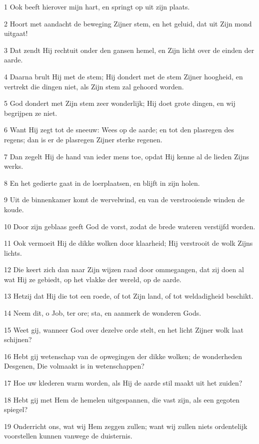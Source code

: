 \par 1 Ook beeft hierover mijn hart, en springt op uit zijn plaats.
\par 2 Hoort met aandacht de beweging Zijner stem, en het geluid, dat uit Zijn mond uitgaat!
\par 3 Dat zendt Hij rechtuit onder den gansen hemel, en Zijn licht over de einden der aarde.
\par 4 Daarna brult Hij met de stem; Hij dondert met de stem Zijner hoogheid, en vertrekt die dingen niet, als Zijn stem zal gehoord worden.
\par 5 God dondert met Zijn stem zeer wonderlijk; Hij doet grote dingen, en wij begrijpen ze niet.
\par 6 Want Hij zegt tot de sneeuw: Wees op de aarde; en tot den plasregen des regens; dan is er de plasregen Zijner sterke regenen.
\par 7 Dan zegelt Hij de hand van ieder mens toe, opdat Hij kenne al de lieden Zijns werks.
\par 8 En het gedierte gaat in de loerplaatsen, en blijft in zijn holen.
\par 9 Uit de binnenkamer komt de wervelwind, en van de verstrooiende winden de koude.
\par 10 Door zijn geblaas geeft God de vorst, zodat de brede wateren verstijfd worden.
\par 11 Ook vermoeit Hij de dikke wolken door klaarheid; Hij verstrooit de wolk Zijns lichts.
\par 12 Die keert zich dan naar Zijn wijzen raad door ommegangen, dat zij doen al wat Hij ze gebiedt, op het vlakke der wereld, op de aarde.
\par 13 Hetzij dat Hij die tot een roede, of tot Zijn land, of tot weldadigheid beschikt.
\par 14 Neem dit, o Job, ter ore; sta, en aanmerk de wonderen Gods.
\par 15 Weet gij, wanneer God over dezelve orde stelt, en het licht Zijner wolk laat schijnen?
\par 16 Hebt gij wetenschap van de opwegingen der dikke wolken; de wonderheden Desgenen, Die volmaakt is in wetenschappen?
\par 17 Hoe uw klederen warm worden, als Hij de aarde stil maakt uit het zuiden?
\par 18 Hebt gij met Hem de hemelen uitgespannen, die vast zijn, als een gegoten spiegel?
\par 19 Onderricht ons, wat wij Hem zeggen zullen; want wij zullen niets ordentelijk voorstellen kunnen vanwege de duisternis.
